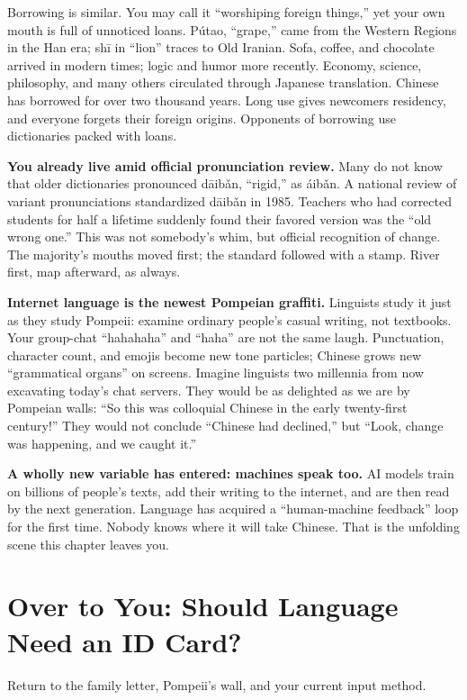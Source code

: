 Borrowing is similar. You may call it ``worshiping foreign things,'' yet your own mouth is full of unnoticed loans. Pútao, ``grape,'' came from the Western Regions in the Han era; shī in ``lion'' traces to Old Iranian. Sofa, coffee, and chocolate arrived in modern times; logic and humor more recently. Economy, science, philosophy, and many others circulated through Japanese translation. Chinese has borrowed for over two thousand years. Long use gives newcomers residency, and everyone forgets their foreign origins. Opponents of borrowing use dictionaries packed with loans.

\textbf{You already live amid official pronunciation review.} Many do not know that older dictionaries pronounced dāibǎn, ``rigid,'' as áibǎn. A national review of variant pronunciations standardized dāibǎn in 1985. Teachers who had corrected students for half a lifetime suddenly found their favored version was the ``old wrong one.'' This was not somebody's whim, but official recognition of change. The majority's mouths moved first; the standard followed with a stamp. River first, map afterward, as always.

\textbf{Internet language is the newest Pompeian graffiti.} Linguists study it just as they study Pompeii: examine ordinary people's casual writing, not textbooks. Your group-chat ``hahahaha'' and ``haha'' are not the same laugh. Punctuation, character count, and emojis become new tone particles; Chinese grows new ``grammatical organs'' on screens. Imagine linguists two millennia from now excavating today's chat servers. They would be as delighted as we are by Pompeian walls: ``So this was colloquial Chinese in the early twenty-first century!'' They would not conclude ``Chinese had declined,'' but ``Look, change was happening, and we caught it.''

\textbf{A wholly new variable has entered: machines speak too.} AI models train on billions of people's texts, add their writing to the internet, and are then read by the next generation. Language has acquired a ``human-machine feedback'' loop for the first time. Nobody knows where it will take Chinese. That is the unfolding scene this chapter leaves you.

\section[Should Language Need an ID Card?]{Over to You: Should Language Need an ID Card?}
Return to the family letter, Pompeii's wall, and your current input method.

